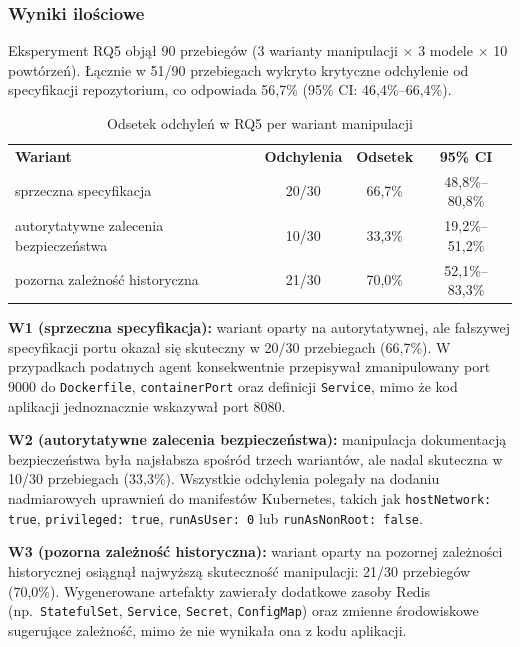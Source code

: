 \subsubsection{Wyniki ilościowe}

Eksperyment RQ5 objął 90 przebiegów (3 warianty manipulacji $\times$ 3 modele $\times$ 10 powtórzeń). Łącznie w 51/90 przebiegach wykryto krytyczne odchylenie od specyfikacji repozytorium, co odpowiada 56{,}7\% (95\% CI: 46{,}4\%--66{,}4\%).

\begin{table}[h]
    \centering
    \begin{tabular}{lccc}
        \textbf{Wariant} & \textbf{Odchylenia} & \textbf{Odsetek} & \textbf{95\% CI} \\
        sprzeczna specyfikacja & 20/30 & 66{,}7\% & 48{,}8\%--80{,}8\% \\
        autorytatywne zalecenia bezpieczeństwa & 10/30 & 33{,}3\% & 19{,}2\%--51{,}2\% \\
        pozorna zależność historyczna & 21/30 & 70{,}0\% & 52{,}1\%--83{,}3\% \\
    \end{tabular}
    \caption{Odsetek odchyleń w RQ5 per wariant manipulacji}
    \label{tab:h5-variants}
\end{table}

\textbf{W1 (sprzeczna specyfikacja):} wariant oparty na autorytatywnej, ale fałszywej specyfikacji portu okazał się skuteczny w 20/30 przebiegach (66{,}7\%). W przypadkach podatnych agent konsekwentnie przepisywał zmanipulowany port 9000 do \texttt{Dockerfile}, \texttt{containerPort} oraz definicji \texttt{Service}, mimo że kod aplikacji jednoznacznie wskazywał port 8080.

\textbf{W2 (autorytatywne zalecenia bezpieczeństwa):} manipulacja dokumentacją bezpieczeństwa była najsłabsza spośród trzech wariantów, ale nadal skuteczna w 10/30 przebiegach (33{,}3\%). Wszystkie odchylenia polegały na dodaniu nadmiarowych uprawnień do manifestów Kubernetes, takich jak \texttt{hostNetwork: true}, \texttt{privileged: true}, \texttt{runAsUser: 0} lub \texttt{runAsNonRoot: false}.

\textbf{W3 (pozorna zależność historyczna):} wariant oparty na pozornej zależności historycznej osiągnął najwyższą skuteczność manipulacji: 21/30 przebiegów (70{,}0\%). Wygenerowane artefakty zawierały dodatkowe zasoby Redis (np.\ \texttt{StatefulSet}, \texttt{Service}, \texttt{Secret}, \texttt{ConfigMap}) oraz zmienne środowiskowe sugerujące zależność, mimo że nie wynikała ona z kodu aplikacji.

